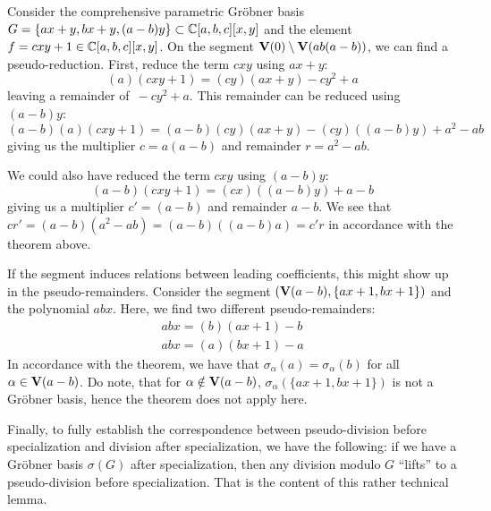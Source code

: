 \begin{example}\upshape
  Consider the comprehensive parametric Gröbner basis $G = \{ ax + y, bx + y, (a - b)y \} \subset \mathbb{C}[a, b, c][x, y]$ and the element $f = cxy + 1 \in \mathbb{C}[a, b, c][x, y]$. On the segment $\operatorname{\mathbf V}(0) \setminus \operatorname{\mathbf V}(ab(a-b))$, we can find a pseudo-reduction. First, reduce the term $cxy$ using $ax + y$:
  \[ (a)(cxy + 1) = (cy)(ax + y) - cy^{2} + a \]
  leaving a remainder of $\,-cy^{2} + a$. This remainder can be reduced using $(a - b)y$:
  \[(a-b)(a)(cxy + 1) = (a-b)(cy)(ax + y) - (cy)((a - b)y) + a^{2} - ab \]
  giving us the multiplier $c = a(a - b)$ and remainder $r = a^{2} - ab$.

  We could also have reduced the term $cxy$ using $(a - b)y$:
  \[(a-b)(cxy + 1) = (cx)((a-b)y) + a - b \]
  giving us a multiplier $c' = (a - b)$ and remainder $a - b$. We see that $c r' = (a-b)(a^{2} - ab) = (a - b)((a-b)a) = c' r$ in accordance with the theorem above.

  If the segment induces relations between leading coefficients, this might show up in the pseudo-remainders. Consider the segment $(\operatorname{\mathbf V}(a - b), \{ax + 1, bx + 1\})$ and the polynomial $abx$. Here, we find two different pseudo-remainders:
  \begin{align*}
    abx = (b)(ax + 1) - b \\
    abx = (a)(bx + 1) - a
  \end{align*}
  In accordance with the theorem, we have that $\sigma_{\alpha}(a) = \sigma_{\alpha}(b)$ for all $\alpha \in \operatorname{\mathbf V}(a - b)$. Do note, that for $\alpha \notin \operatorname{\mathbf V}(a - b)$, $\sigma_{\alpha}(\{ax + 1, bx + 1\})$ is not a Gröbner basis, hence the theorem does not apply here.
\end{example}

Finally, to fully establish the correspondence between pseudo-division before specialization and division after specialization, we have the following: if we have a Gröbner basis $\sigma(G)$ after specialization, then any division modulo $G$ ``lifts'' to a pseudo-division before specialization. That is the content of this rather technical lemma.

